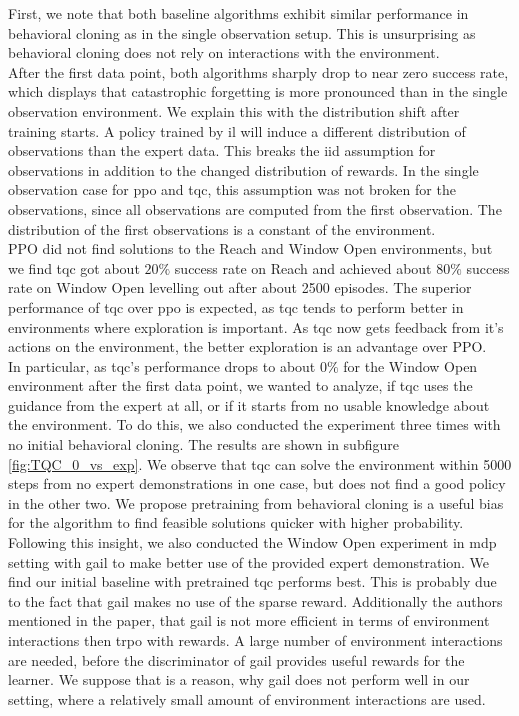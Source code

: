 First, we note that both baseline algorithms exhibit similar performance in behavioral cloning as in the single 
observation setup. This is unsurprising as behavioral cloning does not rely on interactions with the environment. \\

After the first data point, both algorithms sharply drop to near zero success rate, which displays that catastrophic forgetting is more 
pronounced than in the single observation environment. We explain this with the distribution shift after training starts. A policy trained by \ac{il} 
will induce a different distribution of observations than the expert data. This breaks the \ac{iid} assumption for observations in addition to the changed distribution of rewards. 
In the single observation case for \ac{ppo} and \ac{tqc}, this assumption was not broken for the observations, 
since all observations are computed from the first observation. The distribution of the first observations is a constant of the environment.\\

PPO did not find solutions to the Reach and Window Open environments, 
but we find \ac{tqc} got about $20 \%$ success rate on Reach and achieved about $80 \%$ success rate on Window Open levelling out after about 2500 episodes. 
The superior performance of \ac{tqc} over \ac{ppo} is expected, as \ac{tqc} tends to perform better in environments where exploration is important. As \ac{tqc} now gets 
feedback from it's actions on the environment, the better exploration is an advantage over PPO.\\ 

In particular, as \ac{tqc}'s performance drops to about $0 \%$ for the Window Open 
environment after the first data point, we wanted to analyze, if \ac{tqc} uses the guidance from the expert at all, or if it starts from 
no usable knowledge about the environment. To do this, we also conducted the experiment three times with no initial behavioral cloning. The results are shown in 
subfigure \ref{fig:TQC_0_vs_exp}. We observe that \ac{tqc} can solve the environment within 5000 steps from no expert demonstrations in one case, but does not find a good policy in the other two. 
We propose pretraining from behavioral cloning is a useful bias for the algorithm to find feasible solutions quicker with higher probability.\\ 

Following this insight, 
we also conducted the Window Open experiment in \ac{mdp} setting with \ac{gail} to make better use of the provided expert demonstration. We find our initial 
baseline with pretrained \ac{tqc} performs best. This is probably due to the fact that \ac{gail} makes no use of the sparse reward. Additionally 
the authors mentioned in the paper, that \ac{gail} is not more efficient in terms of environment interactions then \ac{trpo} with rewards. A large number of 
environment interactions are needed, before the discriminator of \ac{gail} provides useful rewards for the learner. We suppose that is a reason, why \ac{gail} does not perform 
well in our setting, where a relatively small amount of environment interactions are used.\\ 

